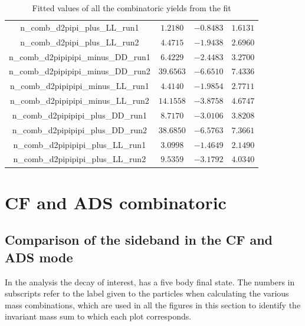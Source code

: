 \begin{table}[h]
{\begin{tabular}{cccc}
n\_comb\_d2pipi\_plus\_LL\_run1 & $1.2180$ & $-0.8483$ & $1.6131$ \\
n\_comb\_d2pipi\_plus\_LL\_run2 & $4.4715$ & $-1.9438$ & $2.6960$ \\
n\_comb\_d2pipipipi\_minus\_DD\_run1 & $6.4229$ & $-2.4483$ & $3.2700$ \\
n\_comb\_d2pipipipi\_minus\_DD\_run2 & $39.6563$ & $-6.6510$ & $7.4336$ \\
n\_comb\_d2pipipipi\_minus\_LL\_run1 & $4.4140$ & $-1.9854$ & $2.7711$ \\
n\_comb\_d2pipipipi\_minus\_LL\_run2 & $14.1558$ & $-3.8758$ & $4.6747$ \\
n\_comb\_d2pipipipi\_plus\_DD\_run1 & $8.7170$ & $-3.0106$ & $3.8208$ \\
n\_comb\_d2pipipipi\_plus\_DD\_run2 & $38.6850$ & $-6.5763$ & $7.3661$ \\
n\_comb\_d2pipipipi\_plus\_LL\_run1 & $3.0998$ & $-1.4649$ & $2.1490$ \\
n\_comb\_d2pipipipi\_plus\_LL\_run2 & $9.5359$ & $-3.1792$ & $4.0340$ \\
\end{tabular}}
\caption{Fitted values of all the combinatoric yields from the \CP fit}
\label{cpfitresultscomb}
\end{table}

\clearpage

\section{CF and ADS combinatoric}
\label{sec:app:combinatoric}


\subsection{Comparison of the sideband in the CF and ADS mode}

In the analysis the decay of interest,  has a five body final state. The numbers in subscripts refer to the label given to the particles when calculating the various mass combinations, which are used in all the figures in this section to identify the invariant mass sum to which each plot corresponds. 

